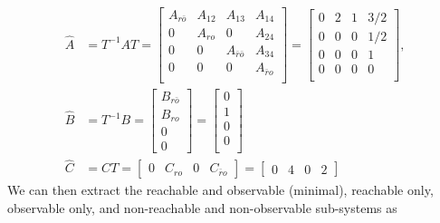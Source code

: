 \documentclass[twoside]{article}
\begin{document}
\begin{align*}
    \hat{A} &= T^{-1} A T =  
    \left[ \begin{array}{c|c|c|c} A_{r\bar{o}} & A_{12} & A_{13} & A_{14} \\ \hline 
    0 & A_{ro} & 0 & A_{24} \\ \hline 
    0 & 0 & A_{\bar{r}\bar{o}} & A_{34} \\ \hline 
    0 & 0 & 0 & A_{\bar{r}o} \\ 
    \end{array} \right] =
    \left[ \begin{array}{c|c|c|c} 0 & 2 & 1 & 3/2 \\ \hline 
    0 & 0 & 0 & 1/2 \\ \hline 
    0 & 0 & 0 & 1 \\ \hline 
    0 & 0 & 0 & 0 \\ 
    \end{array} \right] ,
    \\
    \hat{B} &= T^{-1} B = \left[ \begin{array}{c} B_{r\bar{o}} \\ B_{ro} \\ 0 \\ 0 \end{array} \right]
    =
    \left[ \begin{array}{c} 0  \\ \hline 
    1 \\ \hline 
    0 \\ \hline 
    0 \\ 
    \end{array} \right] \\
    \hat{C} &= C T = \left[ \begin{array}{c|c|c|c} 0 & C_{ro} & 0 & C_{\bar{r}o} \end{array} \right] =
    \left[ \begin{array}{c|c|c|c} 0 & 4 & 0 & 2 \end{array} \right]
\end{align*}
We can then extract the reachable and observable (minimal), reachable only,  observable only, and non-reachable and non-observable sub-systems as
\end{document}
